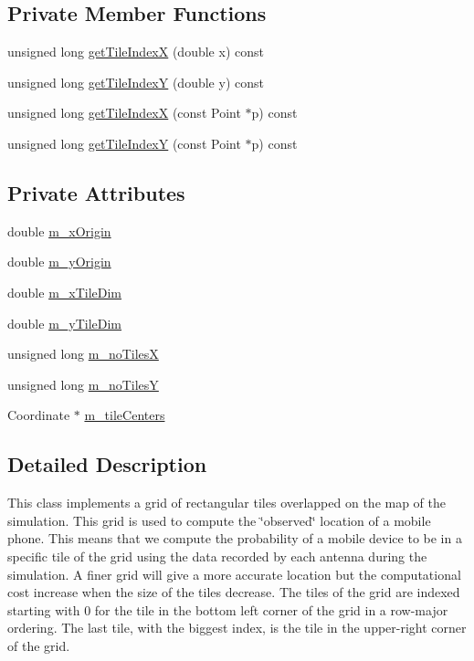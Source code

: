 \subsection*{Private Member Functions}
\begin{DoxyCompactItemize}
\item 
unsigned long \hyperlink{class_grid_a5ab67c336ac08c690a0e8b03c12f02e5}{get\+Tile\+IndexX} (double x) const
\item 
unsigned long \hyperlink{class_grid_ad745f856bb2b27382118ac03fafc06b4}{get\+Tile\+IndexY} (double y) const
\item 
unsigned long \hyperlink{class_grid_af4094832e2adedbbd47889973f5a40da}{get\+Tile\+IndexX} (const Point $\ast$p) const
\item 
unsigned long \hyperlink{class_grid_ae1eeb3b42007ae1cf19cfaf0d846fb9a}{get\+Tile\+IndexY} (const Point $\ast$p) const
\end{DoxyCompactItemize}
\subsection*{Private Attributes}
\begin{DoxyCompactItemize}
\item 
double \hyperlink{class_grid_ae109d428ac5489815748e92fdde1b91f}{m\+\_\+x\+Origin}
\item 
double \hyperlink{class_grid_a16b2fc5a6e96ad2d59d59b52db83f4aa}{m\+\_\+y\+Origin}
\item 
double \hyperlink{class_grid_a48c3d1fc34a14bff8b9176558a8b6f4e}{m\+\_\+x\+Tile\+Dim}
\item 
double \hyperlink{class_grid_a497eeffc4a16a021e15ecbc130f4f644}{m\+\_\+y\+Tile\+Dim}
\item 
unsigned long \hyperlink{class_grid_a177bfdc70436c25a1510d1abe19e34c1}{m\+\_\+no\+TilesX}
\item 
unsigned long \hyperlink{class_grid_a8fe14c4781dfd5623922fcc1f9c10130}{m\+\_\+no\+TilesY}
\item 
Coordinate $\ast$ \hyperlink{class_grid_a27b99b13ac7e5bec81f7b8704bc3405a}{m\+\_\+tile\+Centers}
\end{DoxyCompactItemize}


\subsection{Detailed Description}
This class implements a grid of rectangular tiles overlapped on the map of the simulation. This grid is used to compute the \char`\"{}observed\char`\"{} location of a mobile phone. This means that we compute the probability of a mobile device to be in a specific tile of the grid using the data recorded by each antenna during the simulation. A finer grid will give a more accurate location but the computational cost increase when the size of the tiles decrease. The tiles of the grid are indexed starting with 0 for the tile in the bottom left corner of the grid in a row-\/major ordering. The last tile, with the biggest index, is the tile in the upper-\/right corner of the grid. 

